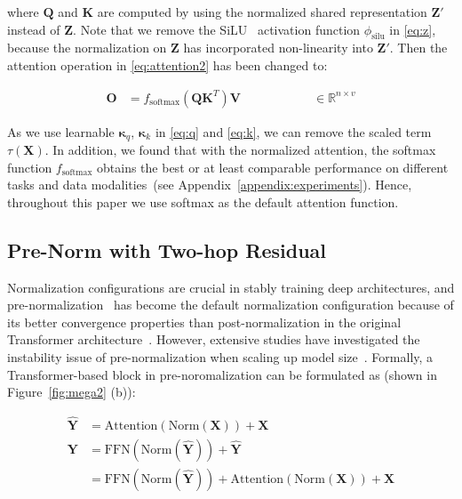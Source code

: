 where $\boldsymbol{Q}$ and $\boldsymbol{K}$ are computed by using the normalized shared representation $\boldsymbol{Z}'$ instead of $\boldsymbol{Z}$. Note that we remove the SiLU~\citep{ramachandran2017swish} activation function $\phi_{\mathrm{silu}}$ in \eqref{eq:z}, because the normalization on $\boldsymbol{Z}$ has incorporated non-linearity into $\boldsymbol{Z}'$.
Then the attention operation in \eqref{eq:attention2} has been changed to:

\begin{align}\label{eq:norm-attention}
\boldsymbol{O} & = f_{\mathrm{softmax}} \left(\boldsymbol{Q}{\boldsymbol{K}}^{T} \right) \boldsymbol{V} \quad & \qquad \qquad \in \mathbb{R}^{n\times v}
\end{align}

As we use learnable $\boldsymbol{\kappa}_q$, $\boldsymbol{\kappa}_k$ in \eqref{eq:q} and \eqref{eq:k}, we can remove the scaled term $\tau(\boldsymbol{X})$.
In addition, we found that with the normalized attention, the softmax function $f_{\mathrm{softmax}}$ obtains the best or at least comparable performance on different tasks and data modalities~(see Appendix~\ref{appendix:experiments}).
Hence, throughout this paper we use softmax as the default attention function.

\subsection{Pre-Norm with Two-hop Residual}
\label{subsec:pre-post-norm}
Normalization configurations are crucial in stably training deep architectures, and pre-normalization~\citep{xiong2020layer} has become the default normalization configuration because of its better convergence properties than post-normalization in the original Transformer architecture~\citep{Vaswani+2017}. However, extensive studies have investigated the instability issue of pre-normalization when scaling up model size~\citep{davis2021catformer,liu2022swin}. Formally, a Transformer-based block in pre-noromalization can be formulated as (shown in Figure~\ref{fig:mega2} (b)):

\begin{align}
\hat{\boldsymbol{Y}} & = \mathrm{Attention}(\mathrm{Norm}(\boldsymbol{X})) + \boldsymbol{X} \nonumber \\
\boldsymbol{Y} & = \mathrm{FFN}(\mathrm{Norm}(\hat{\boldsymbol{Y}})) + \hat{\boldsymbol{Y}} \nonumber \\
 & = \mathrm{FFN}(\mathrm{Norm}(\hat{\boldsymbol{Y}})) + \mathrm{Attention}(\mathrm{Norm}(\boldsymbol{X})) + \boldsymbol{X}
\end{align}

